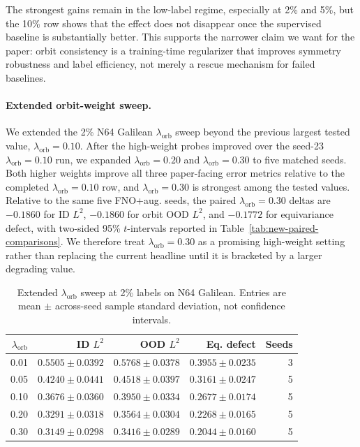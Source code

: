 The strongest gains remain in the low-label regime, especially at 2\% and 5\%, but the 10\% row shows that the effect does not disappear once the supervised baseline is substantially better. This supports the narrower claim we want for the paper: orbit consistency is a training-time regularizer that improves symmetry robustness and label efficiency, not merely a rescue mechanism for failed baselines.

\paragraph{Extended orbit-weight sweep.} We extended the 2\% N64 Galilean \(\lambda_{\mathrm{orb}}\) sweep beyond the previous largest tested value, \(\lambda_{\mathrm{orb}}=0.10\). After the high-weight probes improved over the seed-23 \(\lambda_{\mathrm{orb}}=0.10\) run, we expanded \(\lambda_{\mathrm{orb}}=0.20\) and \(\lambda_{\mathrm{orb}}=0.30\) to five matched seeds. Both higher weights improve all three paper-facing error metrics relative to the completed \(\lambda_{\mathrm{orb}}=0.10\) row, and \(\lambda_{\mathrm{orb}}=0.30\) is strongest among the tested values. Relative to the same five FNO+aug. seeds, the paired \(\lambda_{\mathrm{orb}}=0.30\) deltas are \(-0.1860\) for ID \(L^2\), \(-0.1860\) for orbit OOD \(L^2\), and \(-0.1772\) for equivariance defect, with two-sided 95\% \(t\)-intervals reported in Table~\ref{tab:new-paired-comparisons}. We therefore treat \(\lambda_{\mathrm{orb}}=0.30\) as a promising high-weight setting rather than replacing the current headline until it is bracketed by a larger degrading value.

\begin{table}[t]
\centering
\small
\caption{Extended \(\lambda_{\mathrm{orb}}\) sweep at 2\% labels on N64 Galilean. Entries are mean \(\pm\) across-seed sample standard deviation, not confidence intervals.}
\label{tab:new-lambda-extended}
\begin{tabular}{rrrrr}
\toprule
\(\lambda_{\mathrm{orb}}\) & ID \(L^2\) & OOD \(L^2\) & Eq. defect & Seeds \\
\midrule
0.01 & \(0.5505\pm0.0392\) & \(0.5768\pm0.0378\) & \(0.3955\pm0.0235\) & 3 \\
0.05 & \(0.4240\pm0.0441\) & \(0.4518\pm0.0397\) & \(0.3161\pm0.0247\) & 5 \\
0.10 & \(0.3676\pm0.0360\) & \(0.3950\pm0.0334\) & \(0.2677\pm0.0174\) & 5 \\
0.20 & \(0.3291\pm0.0318\) & \(0.3564\pm0.0304\) & \(0.2268\pm0.0165\) & 5 \\
0.30 & \(\mathbf{0.3149\pm0.0298}\) & \(\mathbf{0.3416\pm0.0289}\) & \(\mathbf{0.2044\pm0.0160}\) & 5 \\
\bottomrule
\end{tabular}
\end{table}

